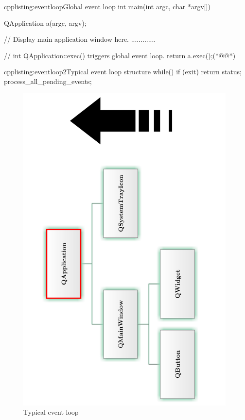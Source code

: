 \begin{fdoccode}{cpp}{listing:eventloop}{Global event loop}
int main(int argc, char *argv[]) {
    QApplication a(argc, argv);
    
    // Display main application window here.
    .............

	// int QApplication::exec() triggers global event loop.
    return a.exec();(*@\label{listing:loop1}@*)
}
\end{fdoccode}

\begin{fdoccode}{cpp}{listing:eventloop2}{Typical event loop structure}
while() {
	if (exit) {
		return status;
	}
	process_all_pending_events;
}
\end{fdoccode}

\begin{figure}[ht]
\centering
\includegraphics[angle=-90,width=11cm]{graphics/laboratory/15-eventloop.pdf}
\caption{Typical event loop}\label{figure:eventloop}
\end{figure}

